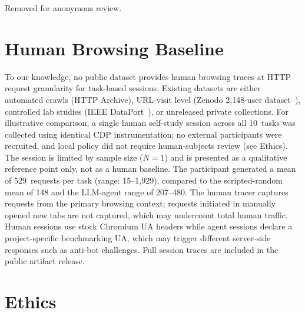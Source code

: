 \documentclass[10pt,sigconf,letterpaper,anonymous,nonacm]{acmart}
\begin{document}
\begin{acks}
Removed for anonymous review.
\end{acks}




\appendix

\section{Human Browsing Baseline}
\label{sec:appendix-human}

To our knowledge, no public dataset provides human browsing traces at
HTTP request granularity for task-based sessions.  Existing datasets
are either automated crawls (HTTP Archive), URL-visit level (Zenodo
2{,}148-user dataset~\cite{kulshrestha2021}), controlled lab studies
(IEEE DataPort~\cite{lopez2022}), or unreleased private collections.
For illustrative comparison, a single human self-study session across
all 10~tasks was collected using identical CDP instrumentation; no
external participants were recruited, and local policy did not require
human-subjects review (see Ethics).  The session is limited by sample
size ($N{=}1$) and is presented as a qualitative reference point only,
not as a human baseline.  The participant generated a
mean of 529~requests per task (range: 15--1{,}929), compared to the
scripted-random mean of 148 and the LLM-agent range of 207--480.
The human tracer captures requests from the primary browsing context; requests initiated in manually opened new tabs are not captured, which may undercount total human traffic.
Human sessions use stock Chromium UA headers while agent sessions declare a project-specific benchmarking UA, which may trigger different server-side responses such as anti-bot challenges.
Full session traces are included in the public artifact release.

\section{Ethics}
\end{document}

